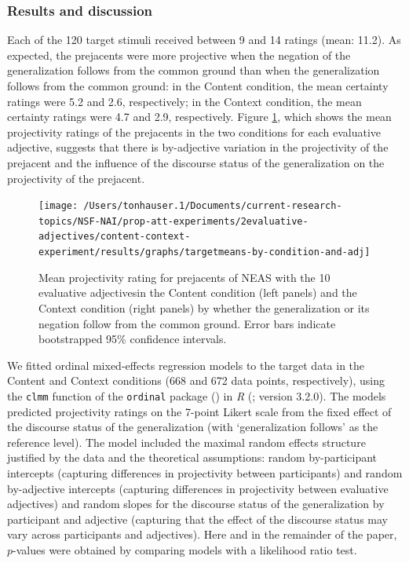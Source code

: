 \documentclass[11pt,fleqn]{article}
\newcommand{\6}{\mbox{$[\hspace*{-.6mm}[$}}
\newcommand{\9}{\mbox{$]\hspace*{-.6mm}]$}}
\begin{document}
\subsubsection{Results and discussion}

Each of the 120 target stimuli received between 9 and 14 ratings (mean: 11.2). As expected, the prejacents were more projective when the negation of the generalization follows from the common ground than when the generalization follows from the common ground: in the Content condition, the mean certainty ratings were 5.2 and 2.6, respectively; in the Context condition, the mean certainty ratings were 4.7 and 2.9, respectively. Figure \ref{f-condis}, which shows the mean projectivity ratings of the prejacents in the two conditions for each evaluative adjective, suggests that there is by-adjective variation in the projectivity of the prejacent and the influence of the discourse status of the generalization on the projectivity of the prejacent.

\begin{figure}[H]
\begin{center}
\texttt{[image: /Users/tonhauser.1/Documents/current-research-topics/NSF-NAI/prop-att-experiments/2evaluative-adjectives/content-context-experiment/results/graphs/targetmeans-by-condition-and-adj]}

\caption{Mean projectivity rating for prejacents of NEAS with the 10 evaluative adjectivesin the Content condition (left panels) and the Context condition (right panels) by whether the generalization or its negation follow from the common ground. Error bars indicate bootstrapped 95\% confidence intervals.}\label{f-condis}
\end{center}
\end{figure}

We fitted ordinal mixed-effects regression models to the target data in the Content and Context conditions (668 and 672 data points, respectively), using the {\tt clmm} function of the {\tt ordinal} package (\citealt{Christensen2013}) in {\em R} (\citealt{r}; version 3.2.0). The models predicted projectivity ratings on the 7-point Likert scale from the fixed effect of the discourse status of the generalization (with `generalization follows' as the reference level). The model included the maximal random effects structure justified by the data and the theoretical assumptions: random by-participant intercepts (capturing differences in projectivity between participants) and random by-adjective intercepts (capturing differences in projectivity between evaluative adjectives) and random slopes for the discourse status of the generalization by participant and adjective (capturing that the effect of the discourse status may vary across participants and adjectives). Here and in the remainder of the paper, $p$-values were obtained by comparing models with a likelihood ratio test.
\end{document}
